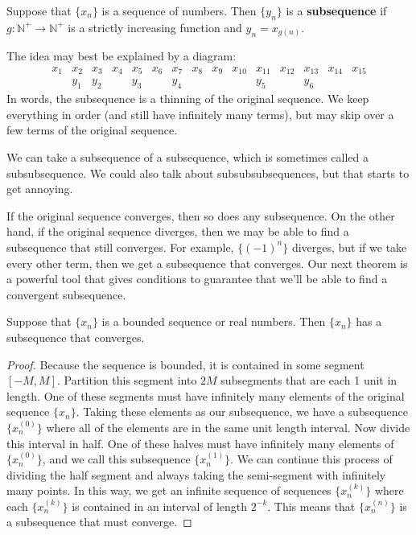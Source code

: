 \begin{definition}[Subsequence]\label{def:subsequence}
Suppose that $\{x_n\}$ is a sequence of numbers.  Then $\{y_n\}$ is a \textbf{subsequence} if $g:\mathbb{N}^+\to\mathbb{N}^+$ is a strictly increasing function and $y_n=x_{g(n)}$.
\end{definition}

The idea may best be explained by a diagram:
\[
\begin{array}{ccccccccccccccc}
 x_1 & x_2 & x_3 & x_4 & x_5 & x_6 & x_7 & x_8 & x_9 & x_{10} & x_{11} & x_{12} & x_{13} & x_{14} & x_{15} \\
 & y_1 & y_2 & & y_3 & & y_4 & & & & y_5 & & y_6 & &
\end{array}
\]
In words, the subsequence is a thinning of the original sequence.  We keep everything in order (and still have infinitely many terms), but may skip over a few terms of the original sequence.

We can take a subsequence of a subsequence, which is sometimes called a subsubsequence.  We could also talk about subsubsubsequences, but that starts to get annoying.

If the original sequence converges, then so does any subsequence.  On the other hand, if the original sequence diverges, then we may be able to find a subsequence that still converges.  For example, $\{(-1)^n\}$ diverges, but if we take every other term, then we get a subsequence that converges.  Our next theorem is a powerful tool that gives conditions to guarantee that we'll be able to find a convergent subsequence.

\begin{theorem}\label{thm:bolzanoWeierstrass}
Suppose that $\{x_n\}$ is a bounded sequence or real numbers.  Then $\{x_n\}$ has a subsequence that converges.
\end{theorem}

\begin{proof}
Because the sequence is bounded, it is contained in some segment $[-M,M]$.
Partition this segment into $2M$ subsegments that are each 1 unit in length.  One of these segments must have infinitely many elements of the original sequence $\{x_n\}$.  Taking these elements as our subsequence, we have a subsequence $\{x_n^{(0)}\}$ where all of the elements are in the same unit length interval.  Now divide this interval in half.  One of these halves must have infinitely many elements of $\{x_n^{(0)}\}$, and we call this subsequence $\{x_n^{(1)}\}$.  We can continue this process of dividing the half segment and always taking the semi-segment with infinitely many points.  In this way, we get an infinite sequence of sequences $\{x_n^{(k)}\}$ where each $\{x_n^{(k)}\}$ is contained in an interval of length $2^{-k}$.  This means that $\{x_n^{(n)}\}$ is a subsequence that must converge.
\end{proof}

